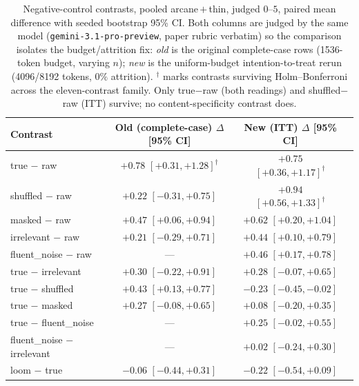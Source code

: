 \documentclass[10pt,twocolumn]{article}
\begin{document}
\begin{table}[t]\centering\small
\caption{Negative-control contrasts, pooled arcane\,$+$\,thin, judged $0$--$5$, paired mean difference
with seeded bootstrap 95\% CI. Both columns are judged by the same model (\texttt{gemini-3.1-pro-preview},
paper rubric verbatim) so the comparison isolates the budget/attrition fix: \emph{old} is the original
complete-case rows (1536-token budget, varying $n$); \emph{new} is the uniform-budget intention-to-treat
rerun (4096/8192 tokens, $0\%$ attrition). $^{\dagger}$ marks contrasts surviving Holm--Bonferroni across
the eleven-contrast family. Only true$-$raw (both readings) and shuffled$-$raw (ITT) survive; no
content-specificity contrast does.}
\label{tab:controls}
\begin{tabular}{lccc}
\toprule
Contrast & Old (complete-case) $\Delta$ [95\% CI] & New (ITT) $\Delta$ [95\% CI] \\
\midrule
true $-$ raw              & $+0.78$ $[+0.31,+1.28]^{\dagger}$ & $+0.75$ $[+0.36,+1.17]^{\dagger}$ \\
shuffled $-$ raw          & $+0.22$ $[-0.31,+0.75]$          & $+0.94$ $[+0.56,+1.33]^{\dagger}$ \\
masked $-$ raw            & $+0.47$ $[+0.06,+0.94]$          & $+0.62$ $[+0.20,+1.04]$ \\
irrelevant $-$ raw        & $+0.21$ $[-0.29,+0.71]$          & $+0.44$ $[+0.10,+0.79]$ \\
fluent\_noise $-$ raw     & ---                              & $+0.46$ $[+0.17,+0.78]$ \\
true $-$ irrelevant       & $+0.30$ $[-0.22,+0.91]$          & $+0.28$ $[-0.07,+0.65]$ \\
true $-$ shuffled         & $+0.43$ $[+0.13,+0.77]$          & $-0.23$ $[-0.45,-0.02]$ \\
true $-$ masked           & $+0.27$ $[-0.08,+0.65]$          & $+0.08$ $[-0.20,+0.35]$ \\
true $-$ fluent\_noise    & ---                              & $+0.25$ $[-0.02,+0.55]$ \\
fluent\_noise $-$ irrelevant & ---                           & $+0.02$ $[-0.24,+0.30]$ \\
loom $-$ true             & $-0.06$ $[-0.44,+0.31]$          & $-0.22$ $[-0.54,+0.09]$ \\
\bottomrule
\end{tabular}
\end{table}
\end{document}
